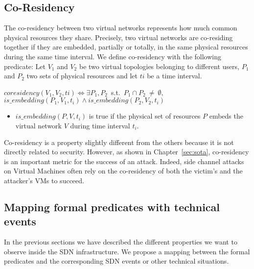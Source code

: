 \subsection{Co-Residency}
\label{sec:prop-cores}
The co-residency between two virtual networks represents how much common physical resources they share.
Precisely, two virtual networks are co-residing together if they are embedded, partially or totally, in the same physical resources during the same time interval.
We define co-residency with the following predicate:
Let $V_1$ and $V_2$ be two virtual topologies belonging to different users, $P_1$ and $P_2$ two sets of physical resources and let $ti$ be a time interval.
\begin{myformula}
$coresidency(V_1,V_2,ti) \Leftrightarrow \exists P_1,P_2$~s.t.~$P_1 \cap P_2~\neq~\emptyset, $\\ $is\_embedding(P_1,V_1,t_i) \wedge is\_embedding(P_2,V_2,t_i)$
\end{myformula}

\begin{itemize}
    \item $is\_embedding(P,V,t_i)$ is true if the physical set of resources $P$ embeds the virtual network $V$ during time interval $t_i$.
\end{itemize}

Co-residency is a property slightly different from the others because it is not directly related to security.
However, as shown in Chapter~\ref{sec:sota}, co-residency is an important metric for the success of an attack.
Indeed, side channel attacks on Virtual Machines often rely on the co-residency of both the victim's and the attacker's VMs to succeed.



\subsection{Mapping formal predicates with technical events}
\label{sec:mapping-model}
In the previous sections we have described the different properties we want to observe inside the SDN infrastructure.
We propose a mapping between the formal predicates and the corresponding SDN events or other technical situations.



